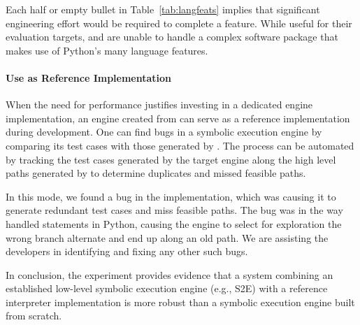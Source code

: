 Each half or empty bullet in Table~\ref{tab:langfeats} implies that significant engineering effort would be required to complete a feature.  While useful for their evaluation targets, \nicese and \cutiepy are unable to handle a complex software package that makes use of Python's many language features.


\paragraph{Use as Reference Implementation}

When the need for performance justifies investing in a dedicated engine implementation, an engine created from \chef can serve as a reference implementation during development.  One can find bugs in a symbolic execution engine by comparing its test cases with those generated by \chef.  The process can be automated by tracking the test cases generated by the target engine along the high level paths generated by \chef to determine duplicates and missed feasible paths.


In this mode, we found a bug in the \nicese implementation, which was causing it to generate redundant test cases and miss feasible paths.  The bug was in the way \nicese handled  statements in Python, causing the engine to select for exploration the wrong branch alternate and end up along an old path.  We are assisting the \nicese developers in identifying and fixing any other such bugs.

In conclusion, the experiment provides evidence that a system combining an established low-level symbolic execution engine (e.g., S2E) with a reference interpreter implementation is more robust than a symbolic execution engine built from scratch.




